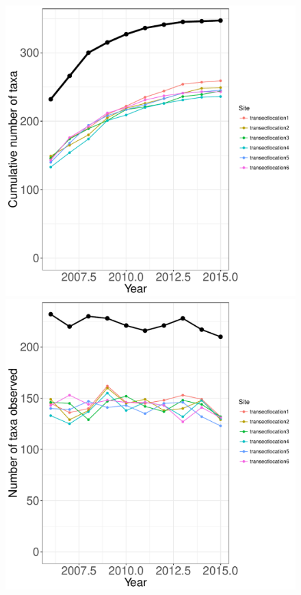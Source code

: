 \documentclass[11pt, oneside]{article}
\begin{document}
\begin{figure}[h!]
\centering
\includegraphics[scale = 0.4]{mcr-fish-castorani_species_accumulation_curve.pdf}
\includegraphics[scale = 0.4]{mcr-fish-castorani_num_taxa_over_time.pdf}

\end{figure}
\end{document}
